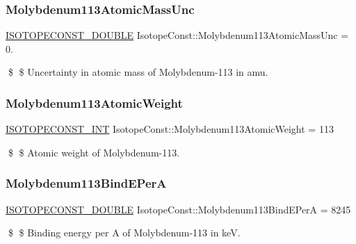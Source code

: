 \subsubsection{\texorpdfstring{Molybdenum113\+Atomic\+Mass\+Unc}{Molybdenum113AtomicMassUnc}}
{\footnotesize\ttfamily \mbox{\hyperlink{group___isotope_const-_macros_ga8f45a7272ce02c0b4c65c44636ed719a}{I\+S\+O\+T\+O\+P\+E\+C\+O\+N\+S\+T\+\_\+\+D\+O\+U\+B\+LE}} Isotope\+Const\+::\+Molybdenum113\+Atomic\+Mass\+Unc = 0.}

\$ \$ Uncertainty in atomic mass of Molybdenum-\/113 in amu. \mbox{\label{group___isotope_const-_molybdenum-_mo113_gabe8c5abc98e0b06ea6828ad10e87bf7b}} 
\subsubsection{\texorpdfstring{Molybdenum113\+Atomic\+Weight}{Molybdenum113AtomicWeight}}
{\footnotesize\ttfamily \mbox{\hyperlink{group___isotope_const-_macros_ga5f18360b3e99483a35c32d789e62621c}{I\+S\+O\+T\+O\+P\+E\+C\+O\+N\+S\+T\+\_\+\+I\+NT}} Isotope\+Const\+::\+Molybdenum113\+Atomic\+Weight = 113}

\$ \$ Atomic weight of Molybdenum-\/113. \mbox{\label{group___isotope_const-_molybdenum-_mo113_ga2dfaa939dcf76f781313cc7494dcdb8e}} 
\subsubsection{\texorpdfstring{Molybdenum113\+Bind\+E\+PerA}{Molybdenum113BindEPerA}}
{\footnotesize\ttfamily \mbox{\hyperlink{group___isotope_const-_macros_ga8f45a7272ce02c0b4c65c44636ed719a}{I\+S\+O\+T\+O\+P\+E\+C\+O\+N\+S\+T\+\_\+\+D\+O\+U\+B\+LE}} Isotope\+Const\+::\+Molybdenum113\+Bind\+E\+PerA = 8245}

\$ \$ Binding energy per A of Molybdenum-\/113 in keV. \mbox{\label{group___isotope_const-_molybdenum-_mo113_gaaa5ac95a09ccd0d38a715301a6af7cdb}} 
